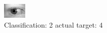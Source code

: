 \begin{figure}[h!]
\begin{center}
\includegraphics[width=0.60\columnwidth]{figures/ID797_class_2_target_4.png}
\end{center}
\caption{ Classification: 2 actual target: 4}
\label{fig:ID797_class_2_target_4}
\end{figure}
